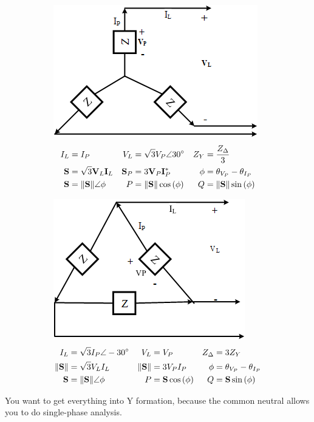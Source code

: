 \documentclass[10pt,letterpaper,final,twoside,notitlepage]{article}
\begin{document}
	\begin{figure} %
		\begin{subfigure}{0.5\textwidth} %
			\centering
			\includegraphics[scale=0.4]{3Phase-Y.png}
			\label{subfig:3 Phase-Y}
			\begin{align*}
				I_{L} &= I_{P} &
				V_{L} &= \sqrt{3} V_{P} \angle 30 \degree &
				Z_{Y} &= \frac{Z_{\Delta}}{3} \\
				\mathbf{S} &= \sqrt{3} \mathbf{V}_{L} \mathbf{I}_{L} &
				\mathbf{S}_{P} &= 3 \mathbf{V}_{P} \mathbf{I}_{P}^{*} &
				\phi &= \theta_{V_{P}} - \theta_{I_{P}} \\
				\mathbf{S} &= \lVert \mathbf{S} \rVert \angle \phi &
				P &= \lVert \mathbf{S} \rVert \cos \left( \phi \right) &
				Q &= \lVert \mathbf{S} \rVert \sin \left( \phi \right) \\
			\end{align*}
		\end{subfigure}
		\vline
		\begin{subfigure}{0.5\textwidth} %
			\centering
			\includegraphics[scale=0.4]{3Phase-Delta.png}
				\begin{align*}
					I_{L} &= \sqrt{3} I_{P} \angle -30 \degree &
					V_{L} &= V_{P} &
					Z_{\Delta} &= 3 Z_{Y} \\
					\lVert \mathbf{S} \rVert &= \sqrt{3} V_{L} I_{L} &
					\lVert \mathbf{S} \rVert &= 3 V_{P} I_{P} &
					\phi &= \theta_{V_{P}} - \theta_{I_{P}} \\
					\mathbf{S} &= \lVert \mathbf{S} \rVert \angle \phi &
					P &= \mathbf{S} \cos \left( \phi \right) &
					Q &= \mathbf{S} \sin \left( \phi \right) \\
				\end{align*}
			\label{subfig:3 Phase-Delta}
		\end{subfigure}
	\end{figure}
You want to get everything into Y formation, because the common neutral allows you to do single-phase analysis.
\vspace{-5mm}
\end{document}
